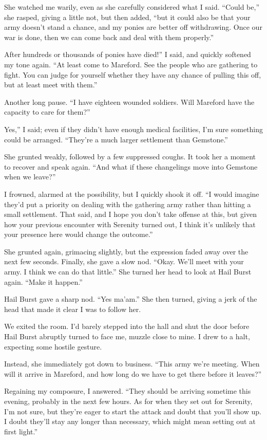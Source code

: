 She watched me warily, even as she carefully considered what I said. “Could be,” she rasped, giving a little not, but then added, “but it could also be that your army doesn’t stand a chance, and my ponies are better off withdrawing. Once our war is done, then we can come back and deal with them properly.”

\leavevmode{}After hundreds or thousands of ponies have died!” I said, and quickly softened my tone again. “At least come to Mareford. See the people who are gathering to fight. You can judge for yourself whether they have any chance of pulling this off, but at least meet with them.”

Another long pause. “I have eighteen wounded soldiers. Will Mareford have the capacity to care for them?”

\leavevmode{}Yes,” I said; even if they didn’t have enough medical facilities, I’m sure something could be arranged. “They’re a much larger settlement than Gemstone.”

She grunted weakly, followed by a few suppressed coughs. It took her a moment to recover and speak again. “And what if these changelings move into Gemstone when we leave?”

I frowned, alarmed at the possibility, but I quickly shook it off. “I would imagine they’d put a priority on dealing with the gathering army rather than hitting a small settlement. That said, and I hope you don’t take offense at this, but given how your previous encounter with Serenity turned out, I think it’s unlikely that your presence here would change the outcome.”

She grunted again, grimacing slightly, but the expression faded away over the next few seconds. Finally, she gave a slow nod. “Okay. We’ll meet with your army. I think we can do that little.” She turned her head to look at Hail Burst again. “Make it happen.”

Hail Burst gave a sharp nod. “Yes ma’am.” She then turned, giving a jerk of the head that made it clear I was to follow her.

We exited the room. I’d barely stepped into the hall and shut the door before Hail Burst abruptly turned to face me, muzzle close to mine. I drew to a halt, expecting some hostile gesture.

Instead, she immediately got down to business. “This army we’re meeting. When will it arrive in Mareford, and how long do we have to get there before it leaves?”

Regaining my composure, I answered. “They should be arriving sometime this evening, probably in the next few hours. As for when they set out for Serenity, I’m not sure, but they’re eager to start the attack and doubt that you’ll show up. I doubt they’ll stay any longer than necessary, which might mean setting out at first light.”

